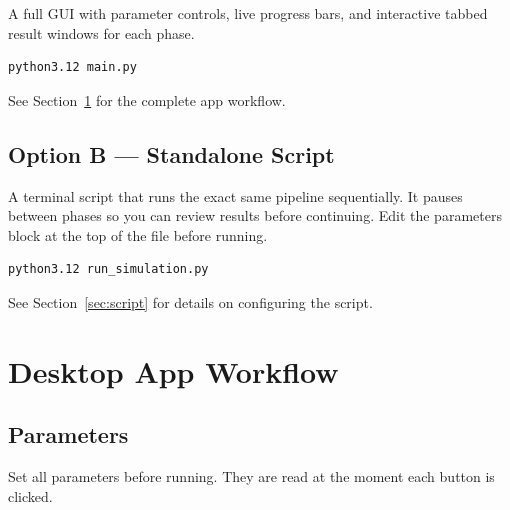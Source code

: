 \documentclass[12pt,a4paper]{article}
\begin{document}
A full GUI with parameter controls, live progress bars, and interactive tabbed
result windows for each phase.

\begin{lstlisting}[language=bash]
python3.12 main.py
\end{lstlisting}

\noindent See Section~\ref{sec:app} for the complete app workflow.

\subsection{Option B --- Standalone Script}

A terminal script that runs the exact same pipeline sequentially. It pauses
between phases so you can review results before continuing. Edit the parameters
block at the top of the file before running.

\begin{lstlisting}[language=bash]
python3.12 run_simulation.py
\end{lstlisting}

\noindent See Section~\ref{sec:script} for details on configuring the script.

\section{Desktop App Workflow}
\label{sec:app}

\subsection*{Parameters}

Set all parameters before running. They are read at the moment each button is clicked.
\end{document}
